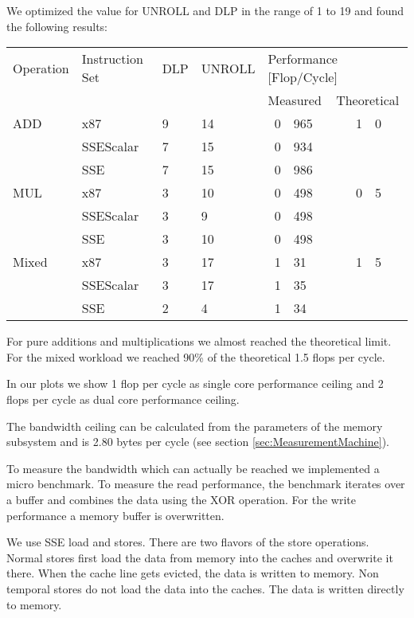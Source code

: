 \documentclass[a4paper,12pt]{report}
\begin{document}
We optimized the value for UNROLL and DLP in the range of 1 to 19 and found the
following results:

\begin{center}
\begin{tabular}{llllr@{.}lr@{.}l}
\toprule
Operation&Instruction Set & DLP & UNROLL &  \multicolumn{4}{l}{Performance
[Flop/Cycle]} \\ \cmidrule{5-8}
&&&&\multicolumn{2}{l}{Measured}&\multicolumn{2}{l}{Theoretical}\\
\midrule
ADD   & x87       &  9 & 14 & 0&965 & 1&0\\
      & SSEScalar &  7 & 15 & 0&934\\
      & SSE       &  7 & 15 & 0&986\\
MUL   & x87       &  3 & 10 & 0&498 & 0&5\\
      & SSEScalar &  3 &  9 & 0&498\\
      & SSE       &  3 & 10 & 0&498\\
Mixed & x87       &  3 & 17 & 1&31 & 1&5\\
      &SSEScalar  &  3 & 17 & 1&35\\
      &SSE        &  2 &  4 & 1&34\\
\bottomrule
\end{tabular}
\end{center}

For pure additions and multiplications we almost reached the theoretical limit.
For the mixed workload we reached 90\% of the theoretical 1.5 flops per cycle.

In our plots we show 1 flop per cycle as single core performance ceiling and 2
flops per cycle as dual core performance ceiling.

The bandwidth ceiling can be calculated from the parameters of the memory
subsystem and is 2.80 bytes per cycle (see section
\ref{sec:MeasurementMachine}).

To measure the bandwidth which can actually be reached we implemented a
micro benchmark. To measure the read performance, the benchmark iterates over a
buffer and combines the data using the XOR operation. For the write performance
a memory buffer is overwritten.

We use SSE load and stores. There are two flavors of the store operations.
Normal stores first load the data from memory into the caches and overwrite it
there. When the cache line gets evicted, the data is written to memory.
Non temporal stores do not load the data into the caches. The data is written
directly to memory.
\end{document}
